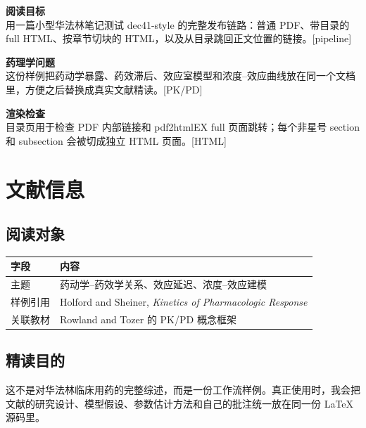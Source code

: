 \documentclass[a4paper]{article}
\begin{document}
\maketitle
{\small
  \noindent\textbf{阅读目标}\\
  用一篇小型华法林笔记测试 dec41-style 的完整发布链路：普通 PDF、带目录的 full HTML、按章节切块的 HTML，以及从目录跳回正文位置的链接。\hspace*{\fill}[pipeline]

  \vspace{5pt}
  \noindent\textbf{药理学问题}\\
  这份样例把药动学暴露、药效滞后、效应室模型和浓度--效应曲线放在同一个文档里，方便之后替换成真实文献精读。\hspace*{\fill}[PK/PD]

  \vspace{5pt}
  \noindent\textbf{渲染检查}\\
  目录页用于检查 PDF 内部链接和 pdf2htmlEX full 页面跳转；每个非星号 section 和 subsection 会被切成独立 HTML 页面。\hspace*{\fill}[HTML]
}

\tableofcontents

\section{文献信息}

\subsection{阅读对象}

\begin{tabular}{ll}
\toprule
字段 & 内容 \\
\midrule
主题 & 药动学--药效学关系、效应延迟、浓度--效应建模 \\
样例引用 & Holford and Sheiner, \emph{Kinetics of Pharmacologic Response} \cite{holford1982kinetics} \\
关联教材 & Rowland and Tozer 的 PK/PD 概念框架 \cite{rowland2011clinical} \\
\bottomrule
\end{tabular}

\subsection{精读目的}

这不是对华法林临床用药的完整综述，而是一份工作流样例。真正使用时，我会把文献的研究设计、模型假设、参数估计方法和自己的批注统一放在同一份 \LaTeX{} 源码里。
\end{document}

